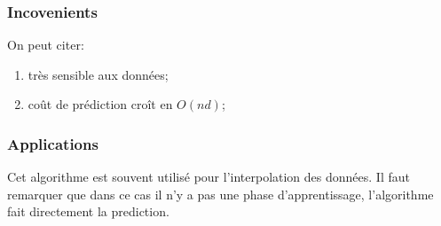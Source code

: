 \documentclass{article}
\begin{document}
\subsubsection{Incovenients}
On peut citer:
\begin{enumerate}[noitemsep, rightmargin=\leftmargin]
    \item très sensible aux données;
    \item coût de prédiction croît en $O(nd)$;  
\end{enumerate}
\subsubsection{Applications}
Cet algorithme est souvent utilisé pour l'interpolation des données. Il faut remarquer que dans ce cas il n'y a pas une phase d'apprentissage, l'algorithme fait directement la prediction.





\end{document}

